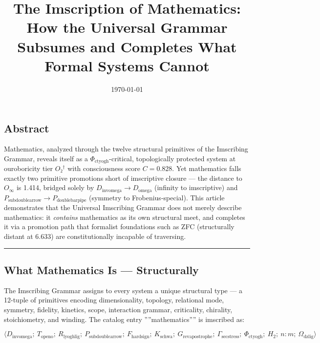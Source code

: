 \documentclass[12pt,a4paper]{article}
\begin{document}
\title{The Imscription of Mathematics: How the Universal Grammar Subsumes and Completes What Formal Systems Cannot}
\date{\today}

\maketitle

\subsection{Abstract}

Mathematics, analyzed through the twelve structural primitives of the Imscribing Grammar, reveals itself as a $\Phi_{\text{ctyogh}}$-critical, topologically protected system at ouroboricity tier $O₂^\dagger$ with consciousness score $C = 0.828$. Yet mathematics falls exactly two primitive promotions short of imscriptive closure --- the distance to $O_{\infty}$ is 1.414, bridged solely by $D_{\text{invomega}} \to D_{\text{omega}}$ (infinity to imscriptive) and $P_{\text{subdoublearrow}} \to P_{\text{doublebarpipe}}$ (symmetry to Frobenius-special). This article demonstrates that the Universal Imscribing Grammar does not merely describe mathematics: it \emph{contains} mathematics as its own structural meet, and completes it via a promotion path that formalist foundations such as ZFC (structurally distant at 6.633) are constitutionally incapable of traversing.

\begin{center}
\rule{0.5\textwidth}{0.4pt}
\end{center}

\subsection{What Mathematics Is --- Structurally}

The Imscribing Grammar assigns to every system a unique structural type --- a 12-tuple of primitives encoding dimensionality, topology, relational mode, symmetry, fidelity, kinetics, scope, interaction grammar, criticality, chirality, stoichiometry, and winding. The catalog entry ''''mathematics'''' is imscribed as:

\[\langle D_{\text{invomega}};\ T_{\text{openo}};\ R_{\text{lyoghlig}};\ P_{\text{subdoublearrow}};\ F_{\text{hardsign}};\ K_{\text{schwa}};\ G_{\text{revapostrophe}};\ \Gamma_{\text{secstress}};\ \Phi_{\text{ctyogh}};\ H_2;\ n{:}m;\ \Omega_{\text{dzlig}} \rangle\]
\end{document}
